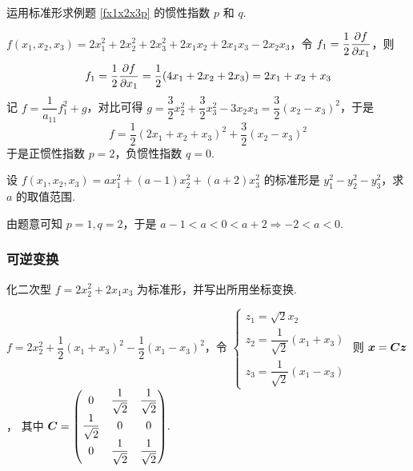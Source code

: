 
\begin{example}
    运用标准形求例题 \ref{fx1x2x3p} 的惯性指数 $p$ 和 $q$.
\end{example}
\begin{solution}
    $f(x_1,x_2,x_3)=2x_1^2+2x_2^2+2x_3^2+2x_1x_2+2x_1x_3-2x_2x_3$，令 $f_1=\dfrac{1}{2}\displaystyle\pdv{f}{x_1}$，则 $$f_1=\dfrac{1}{2}\pdv{f}{x_1}=\dfrac{1}{2}(4x_1+2x_2+2x_3)=2x_1+x_2+x_3$$
    记 $f=\dfrac{1}{a_{11}}f_1^2+g$，对比可得 $g=\dfrac{3}{2}x_2^2+\dfrac{3}{2}x_3^2-3x_2x_3=\dfrac{3}{2}(x_2-x_3)^2$，于是 $$f=\dfrac{1}{2}(2x_1+x_2+x_3)^2+\dfrac{3}{2}(x_2-x_3)^2$$
    于是正惯性指数 $p=2$，负惯性指数 $q=0.$
\end{solution}

\begin{example}
    设 $f(x_1,x_2,x_3)=ax_1^2+(a-1)x_2^2+(a+2)x_3^2$ 的标准形是 $y_1^2-y_2^2-y_3^2$，求 $a$ 的取值范围.
\end{example}
\begin{solution}
    由题意可知 $p=1,q=2$，于是 $a-1<a<0<a+2\Rightarrow -2<a<0.$
\end{solution}

\subsubsection{可逆变换}

\begin{example}
    化二次型 $f=2x_2^2+2x_1x_3$ 为标准形，并写出所用坐标变换.
\end{example}
\begin{solution}
    $f=2x_2^2+\dfrac{1}{2}(x_1+x_3)^2-\dfrac{1}{2}(x_1-x_3)^2$，令
    $\begin{cases}
            z_1=\sqrt2x_2                  \\
            z_2=\dfrac{1}{\sqrt2}(x_1+x_3) \\[6pt]
            z_3=\dfrac{1}{\sqrt2}(x_1-x_3)
        \end{cases}$ 则 $\vb*{x}=\vb*{Cz}$，
    其中 $\vb*{C}=\mqty(0&\dfrac{1}{\sqrt2}&\dfrac{1}{\sqrt2}\\[6pt]\dfrac{1}{\sqrt2}&0&0\\[6pt]0&\dfrac{1}{\sqrt{2}}&\dfrac{1}{\sqrt{2}}).$
\end{solution}

